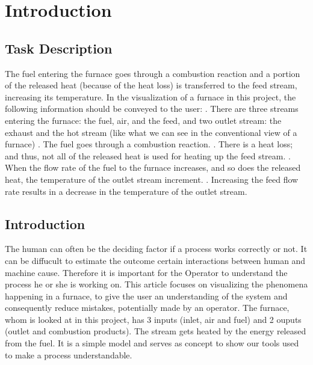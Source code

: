 \section*{Introduction}

\subsection*{Task Description}

The fuel entering the furnace goes through a combustion reaction and a portion of the released heat 
(because of the heat loss) is transferred to the feed stream, increasing its temperature. In the
visualization of a furnace in this project, the following information should be conveyed to the user: 
. There are three streams entering the furnace: the fuel, air, and the feed, and two outlet 
stream: the exhaust and the hot stream (like what we can see in the conventional view of a 
furnace) 
. The fuel goes through a combustion reaction.
. There is a heat loss; and thus, not all of the released heat is used for heating up the feed 
stream.
. When the flow rate of the fuel to the furnace increases, and so does the released heat, the 
temperature of the outlet stream increment.
. Increasing the feed flow rate results in a decrease in the temperature of the outlet stream. 

\subsection*{Introduction}

The human can often be the deciding factor if a process works correctly or not. It can be diffucult to  estimate the outcome certain interactions between human and machine cause. Therefore it is important for the Operator to understand the process he or she is working on.
\newline
This article focuses on visualizing the phenomena happening in a furnace, to give the user an understanding of the system and consequently reduce mistakes, potentially made by an operator.
\newline
The furnace, whom is looked at in this project, has 3 inputs (inlet, air and fuel) and 2 ouputs (outlet and combustion products). The stream gets heated by the energy released from the fuel. It is a simple model and serves as concept to show our tools used to make a process understandable.
\newline

